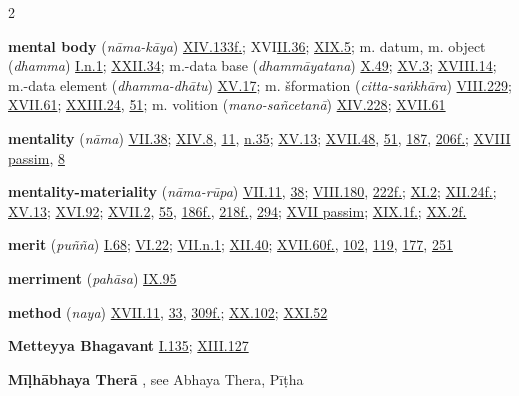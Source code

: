 \begin{multicols}{2}
\begin{vismHanging}
\par\textbf{mental body} (\emph{nāma-kāya}) \hyperlink{XIV.133}{XIV.133f.}{}; XVI\hyperlink{II.36}{II.36}{}; \hyperlink{XIX.5}{XIX.5}{}; m. datum, m. object (\emph{dhamma}) \hyperlink{I.n1}{I.n.1}{}; \hyperlink{XXII.34}{XXII.34}{}; m.-data base (\emph{dhammāyatana}) \hyperlink{X.49}{X.49}{}; \hyperlink{XV.3}{XV.3}{}; \hyperlink{XVIII.14}{XVIII.14}{}; m.-data element (\emph{dhamma-dhātu}) \hyperlink{XV.17}{XV.17}{}; m. šformation (\emph{citta-saṅkhāra}) \hyperlink{VIII.229}{VIII.229}{}; \hyperlink{XVII.61}{XVII.61}{}; \hyperlink{XXIII.24}{XXIII.24}{}, \hyperlink{XXIII.51}{51}{}; m. volition (\emph{mano-sañcetanā}) \hyperlink{XIV.228}{XIV.228}{}; \hyperlink{XVII.61}{XVII.61}{}
\par\textbf{mentality} (\emph{nāma}) \hyperlink{VII.38}{VII.38}{}; \hyperlink{XIV.8}{XIV.8}{}, \hyperlink{XIV.11}{11}{}, \hyperlink{XIV.n35}{n.35}{}; \hyperlink{XV.13}{XV.13}{}; \hyperlink{XVII.48}{XVII.48}{}, \hyperlink{XVII.51}{51}{}, \hyperlink{XVII.187}{187}{}, \hyperlink{XVII.206}{206f.}{}; \hyperlink{XVIII}{XVIII passim}{}, \hyperlink{XVIII.8}{8}{}
\par\textbf{mentality-materiality} (\emph{nāma-rūpa}) \hyperlink{VII.11}{VII.11}{}, \hyperlink{VII.38}{38}{}; \hyperlink{VIII.180}{VIII.180}{}, \hyperlink{VIII.222}{222f.}{}; \hyperlink{XI.2}{XI.2}{}; \hyperlink{XII.24}{XII.24f.}{}; \hyperlink{XV.13}{XV.13}{}; \hyperlink{XVI.92}{XVI.92}{}; \hyperlink{XVII.2}{XVII.2}{}, \hyperlink{XVII.55}{55}{}, \hyperlink{XVII.186}{186f.}{}, \hyperlink{XVII.218}{218f.}{}, \hyperlink{XVII.294}{294}{}; \hyperlink{XVII}{XVII passim}{}; \hyperlink{XIX.1}{XIX.1f.}{}; \hyperlink{XX.2}{XX.2f.}{}
\par\textbf{merit} (\emph{puñña}) \hyperlink{I.68}{I.68}{}; \hyperlink{VI.22}{VI.22}{}; \hyperlink{VII.n1}{VII.n.1}{}; \hyperlink{XII.40}{XII.40}{}; \hyperlink{XVII.60}{XVII.60f.}{}, \hyperlink{XVII.102}{102}{}, \hyperlink{XVII.119}{119}{}, \hyperlink{XVII.177}{177}{}, \hyperlink{XVII.251}{251}{}
\par\textbf{merriment} (\emph{pahāsa}) \hyperlink{IX.95}{IX.95}{}
\par\textbf{method} (\emph{naya}) \hyperlink{XVII.11}{XVII.11}{}, \hyperlink{XVII.33}{33}{}, \hyperlink{XVII.309}{309f.}{}; \hyperlink{XX.102}{XX.102}{}; \hyperlink{XXI.52}{XXI.52}{}
\par\textbf{Metteyya Bhagavant} \hyperlink{I.135}{I.135}{}; \hyperlink{XIII.127}{XIII.127}{}
\par\textbf{Mīḷhābhaya Therā} , see Abhaya Thera, Pīṭha 

\end{vismHanging}
\end{multicols}
